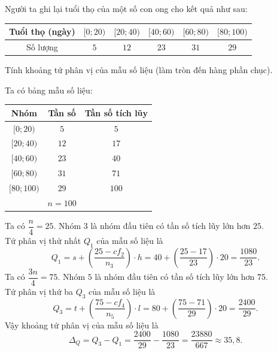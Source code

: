 \begin{bt}%
	Người ta ghi lại tuổi thọ của một số con ong cho kết quả như sau:
	\begin{center}
		\begin{tabular}{|c|c|c|c|c|c|}
			\hline Tuổi thọ (ngày) & {$[0 ; 20)$} & {$[20 ; 40)$} & {$[40 ; 60)$} & {$[60 ; 80)$} & {$[80 ; 100)$} \\
			\hline Số lượng & $5$ & $12$ & $23$ & $31$ & $29$ \\
			\hline
		\end{tabular}
	\end{center}
	Tính khoảng tứ phân vị của mẫu số liệu (làm tròn đến hàng phần chục).
	\loigiai
	{ Ta có bảng mẫu số liệu:
		\begin{center}
			\begin{tabular}{|c|c|c|}
				\hline Nhóm & Tần số & Tần số tích lũy \\
				\hline$[0 ; 20)$ & $5$ & $5$ \\
				\hline$[20 ; 40)$ & $12$ & $17$ \\
				\hline$[40 ; 60)$ & $23$ & $40$ \\
				\hline$[60 ; 80)$ & $31$ & $71$ \\
				\hline$[80 ; 100)$ & $29$ & $100$ \\
				\hline & $n=100$ & \\
				\hline
			\end{tabular}
		\end{center}
		Ta có $\dfrac{n}{4}=25$. Nhóm $3$ là nhóm đầu tiên có tần số tích lũy lớn hơn $25$.\\
		Tứ phân vị thứ nhất $Q_1$ của mẫu số liệu là
		$$
		Q_1=s+\left(\dfrac{25-c f_2}{n_3}\right) \cdot h=40+\left(\dfrac{25-17}{23}\right) \cdot 20=\dfrac{1080}{23}.
		$$
		Ta có $\dfrac{3 n}{4}=75$. Nhóm $5$ là nhóm đầu tiên có tần số tích lũy lớn hơn $75$.\\
		Tứ phân vị thứ ba $Q_3$ của mẫu số liệu là
		$$
		Q_3=t+\left(\dfrac{75-c f_4}{n_5}\right) \cdot l=80+\left(\dfrac{75-71}{29}\right) \cdot 20=\dfrac{2400}{29}.
		$$
		Vậy khoảng tứ phân vị của mẫu số liệu là
		$$
		\Delta_Q=Q_3-Q_1=\dfrac{2400}{29}-\dfrac{1080}{23}=\dfrac{23880}{667} \approx 35{,}8.
		$$
	}
\end{bt}

